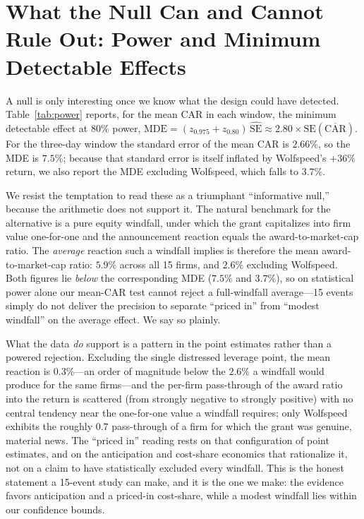 \documentclass[12pt]{article}
\begin{document}
\section{What the Null Can and Cannot Rule Out: Power and Minimum Detectable Effects}\label{sec:power}
A null is only interesting once we know what the design could have detected. Table~\ref{tab:power}
reports, for the mean CAR in each window, the minimum detectable effect at 80\% power,
$\text{MDE}=(z_{0.975}+z_{0.80})\,\widehat{\text{SE}}\approx 2.80\times\text{SE}(\overline{\text{CAR}})$.
For the three-day window the standard error of the mean CAR is $2.66\%$, so the MDE is $7.5\%$;
because that standard error is itself inflated by Wolfspeed's $+36\%$ return, we also report the MDE
excluding Wolfspeed, which falls to $3.7\%$.

We resist the temptation to read these as a triumphant ``informative null,'' because the arithmetic
does not support it. The natural benchmark for the alternative is a pure equity windfall, under
which the grant capitalizes into firm value one-for-one and the announcement reaction equals the
award-to-market-cap ratio. The \emph{average} reaction such a windfall implies is therefore the mean
award-to-market-cap ratio: $5.9\%$ across all 15 firms, and $2.6\%$ excluding Wolfspeed. Both figures
lie \emph{below} the corresponding MDE ($7.5\%$ and $3.7\%$), so on statistical power alone our
mean-CAR test cannot reject a full-windfall average---15 events simply do not deliver the precision
to separate ``priced in'' from ``modest windfall'' on the average effect. We say so plainly.

What the data \emph{do} support is a pattern in the point estimates rather than a powered rejection.
Excluding the single distressed leverage point, the mean reaction is $0.3\%$---an order of magnitude
below the $2.6\%$ a windfall would produce for the same firms---and the per-firm pass-through of the
award ratio into the return is scattered (from strongly negative to strongly positive) with no
central tendency near the one-for-one value a windfall requires; only Wolfspeed exhibits the roughly
$0.7$ pass-through of a firm for which the grant was genuine, material news. The ``priced in'' reading
rests on that configuration of point estimates, and on the anticipation and cost-share economics that
rationalize it, not on a claim to have statistically excluded every windfall. This is the honest
statement a 15-event study can make, and it is the one we make: the evidence favors anticipation and
a priced-in cost-share, while a modest windfall lies within our confidence bounds.
\end{document}
